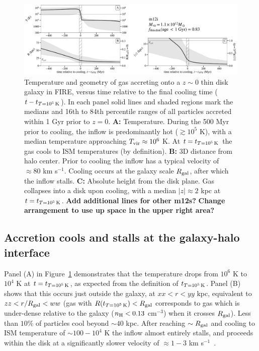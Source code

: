 \documentclass[fleqn,usenatbib]{mnras}
\newcommand{\tcon}{t_{T=10^5\,{\rm K}}}
\newcommand{\Tvir}{T_{\rm vir}}
\begin{document}
\begin{figure}
\includegraphics[width=\textwidth]{figures/before_and_after/before_and_after_characteristics_m12i_md.pdf}
\caption{
Temperature and geometry of gas accreting onto a $z\sim0$ thin disk galaxy in FIRE, versus time relative to the final cooling time ($t - \tcon$).
In each panel solid lines and shaded regions mark the medians and 16th to 84th percentile ranges of all particles accreted within 1 Gyr prior to $z=0$.
\textbf{A:}
Temperature. During the 500 Myr prior to cooling, the inflow is predominantly hot ($\gtrsim 10^5$ K), with a median temperature approaching $\Tvir\approx10^6$ K. At $t = \tcon$ the gas cools to ISM temperatures (by definition).
\textbf{B:}
3D distance from halo center. Prior to cooling the inflow has a typical velocity of $\approx 80$ km s$^{-1}$. Cooling occurs at the galaxy scale $R_{\rm gal}$, after which the inflow stalls.
\textbf{C:}
Absolute height from the disk plane.
Gas collapses into a disk upon cooling, with a median $\vert z \vert \approx 2$ kpc at $t=\tcon$.
\textbf{Add additional lines for other m12s?}
\textbf{Change arrangement to use up space in the upper right area?}
}
\label{f: before and after A}
\end{figure}


\subsection{Accretion cools and stalls at the galaxy-halo interface}
\label{s: characteristics -- cools}

Panel (A) in Figure~\ref{f: before and after A} demonstrates that the temperature drops from $10^6$ K to $10^4$ K at $t = \tcon$, as expected from the definition of $\tcon$. Panel (B) shows that this occurs just outside the galaxy, at $xx < r < yy$ kpc, equivalent to $zz < r/R_{\rm gal} < ww$ (gas with $R(\tcon) < R_{\rm gal}$ corresponds to gas which is under-dense relative to the galaxy ($n_{\rm H} < 0.13$ cm$^{-3}$) when it crosses $R_{\rm gal}$). Less than $10\%$ of particles cool beyond $\sim 40$ kpc. 
After reaching $\sim R_{\rm gal}$ and cooling to ISM temperature of $\sim100- 10^4$ K the inflow almost entirely stalls, and proceeds within the disk at a significantly slower velocity of $\approx1-3$ km s$^{-1}$~\citep[see also][]{Trapp2021}.
\end{document}
